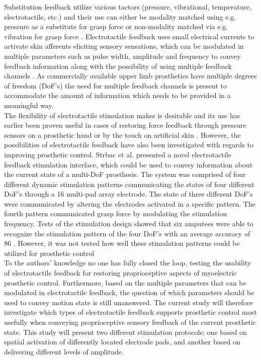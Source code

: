 Substitution feedback utilize various tactors (pressure, vibrational, temperature, electrotactile, etc.) and their use can either be modality matched using e.g. pressure as a substitute for grasp force \cite{Godfrey2017} or non-modality matched via e.g. vibration for grasp force \cite{Ninu2014,Nabeel2016}. 
Electrotactile feedback uses small electrical currents to activate skin afferents eliciting sensory sensations, which can be modulated in multiple parameters such as pulse width, amplitude and frequency to convey feedback information along with the possibility of using multiple feedback channels \cite{Geng2012}. As commercially available upper limb prosthetics have multiple degrees of freedom (DoF's) \cite{Cordella2016} the need for multiple feedback channels is present to accommodate the amount of information which needs to be provided in a meaningful way. \\
%
The flexibility of electrotactile stimulation makes is desirable and its use has earlier been proven useful in cases of restoring force feedback through pressure sensors on a prosthetic hand or by the touch on artificial skin \cite{Hartmann2014,Franceschi2015}. However, the possibilities of electrotactile feedback have also been investigated with regards to improving prosthetic control. Strbac et al. \cite{Strbac2016} presented a novel electrotactile feedback stimulation interface, which could be used to convey information about the current state of a multi-DoF prosthesis. The system was comprised of four different dynamic stimulation patterns communicating the states of four different DoF's through a 16 multi-pad array electrode. The state of three different DoF's were communicated by altering the electrodes activated in a specific pattern. The fourth pattern communicated grasp force by modulating the stimulation frequency. Tests of the stimulation design showed that six amputees were able to recognize the stimulation pattern of the four DoF's with an average accuracy of 86 \percent. \cite{Strbac2016} However, it was not tested how well these stimulation patterns could be utilized for prosthetic control  \\   
%
To the authors' knowledge no one has fully closed the loop, testing the usability of electrotactile feedback for restoring proprioceptive aspects of myoelectric prosthetic control. Furthermore, based on the multiple parameters that can be modulated in electrotactile feedback, the question of which parameters should be used to convey motion state is still unanswered. The current study will therefore investigate which types of electrotactile feedback supports prosthetic control most usefully when conveying proprioceptive sensory feedback of the current prosthetic state. This study will present two different stimulation protocols; one based on spatial activation of differently located electrode pads, and another based on delivering different levels of amplitude.      





 
